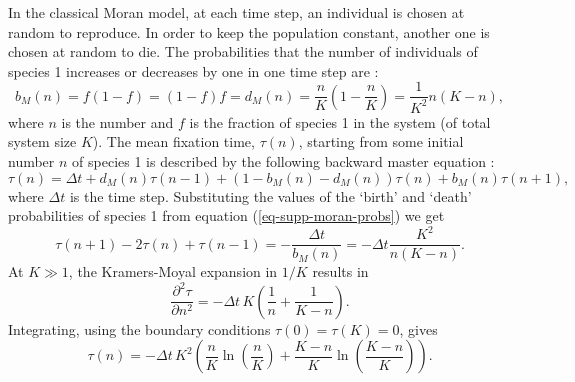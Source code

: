 In the classical Moran model, at each time step, an individual is chosen at random to reproduce. In order to keep the population constant, another one is chosen at random to die. %
The probabilities that the number of individuals of species 1 increases or decreases by one  in one time step are \cite{Moran1962}:
\begin{equation}
b_{M}(n) = f(1-f) = (1-f)f = d_{M}(n) = \frac{n}{K}\left(1-\frac{n}{K}\right) = \frac{1}{K^2}n(K-n),
\label{eq-supp-moran-probs}
\end{equation}
where $n$ is the number and $f$ is the fraction of species 1 in the system (of total system size $K$). 
The mean fixation time, $\tau(n)$, starting from some initial number $n$ of species 1 is described by the following backward master equation \cite{Nisbet1982}:
\begin{equation*}
\tau(n) = \Delta t + d_{M}(n)\tau(n-1) + \left(1-b_{M}(n)-d_{M}(n)\right)\tau(n) + b_{M}(n)\tau(n+1),
\end{equation*}
where $\Delta t$ is the time step. 
Substituting the values of the `birth' and `death' probabilities of species 1 from equation (\ref{eq-supp-moran-probs}) we get
\begin{equation*}
\tau(n+1) - 2\tau(n) + \tau(n-1) = -\frac{\Delta t}{b_{M}(n)} = -\Delta t\frac{K^2}{n(K-n)}.
\end{equation*}
At $K\gg 1$, the Kramers-Moyal expansion in $1/K$ results in
\begin{equation*}
\frac{\partial^2\tau}{\partial n^2} = -\Delta t\,K\left(\frac{1}{n}+\frac{1}{K-n}\right).
\end{equation*}
Integrating, using the boundary conditions  $\tau(0) = \tau(K)=0$, gives
\begin{equation}
\tau(n) = -\Delta t\,K^2\left(\frac{n}{K}\ln\left(\frac{n}{K}\right)+\frac{K-n}{K}\ln\left(\frac{K-n}{K}\right)\right).
\end{equation}\label{Morantime}

